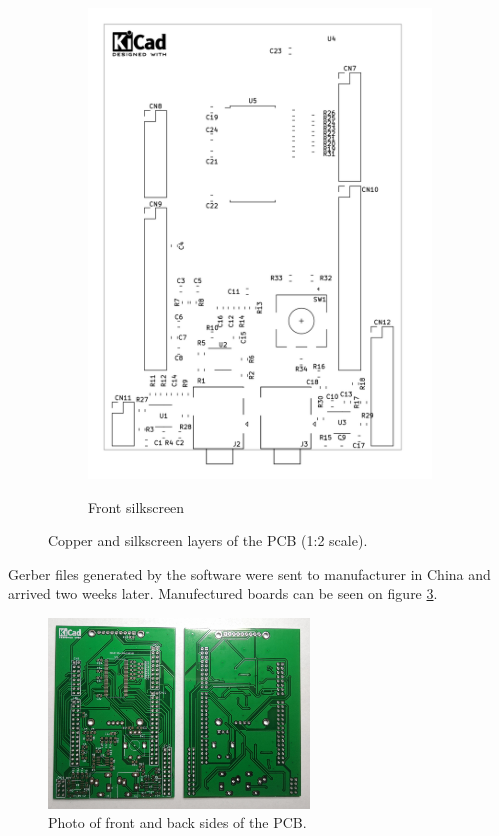 \documentclass[a4paper,twoside,12pt]{book}
\begin{document}
\begin{figure}[H]
\begin{subfigure}[h]{0.273\textwidth}
        \includegraphics[width=\textwidth]{images/Board_silkscreen}
        \label{fig:board3}
        \caption{Front silkscreen}
    \end{subfigure}
    \caption{Copper and silkscreen layers of the PCB (1:2 scale).}
    \label{fig:board}
\end{figure}

Gerber files generated by the software were sent to manufacturer in China
and arrived two weeks later.
Manufectured boards can be seen on figure \ref{fig:photo_boards}.

\begin{figure}[H]
    \centering
    \includegraphics[width=0.618\textwidth]{images/photo_boards}
    \caption{Photo of front and back sides of the PCB.}
    \label{fig:photo_boards}
\end{figure}
\end{document}
